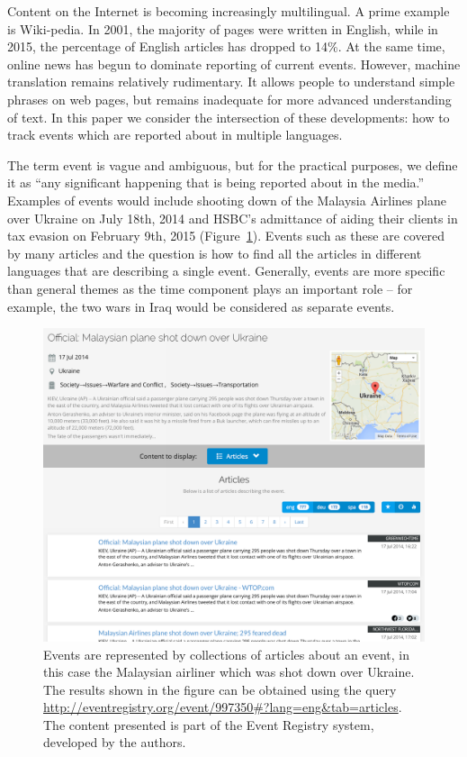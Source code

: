 \documentclass[twoside,11pt]{article}
\begin{document}
Content on the Internet is becoming increasingly multilingual. A prime example is Wiki-pedia. In 2001, the majority of pages were written in English, while in 2015, the percentage of English articles has dropped to 14\%. At the same time, online news has begun to dominate reporting of current events. However, machine translation remains relatively rudimentary. It allows people to understand simple phrases on web pages, but remains inadequate for more advanced understanding of text. In this paper we consider the intersection of these developments: how to track events which are reported about in multiple languages.

The term event is vague and ambiguous, but for the practical purposes, we define it as ``any significant happening that is being reported about in the media.'' Examples of events would include shooting down of the Malaysia Airlines plane over Ukraine on July 18th, 2014 and HSBC's admittance of aiding their clients in tax evasion on February 9th, 2015 (Figure~\ref{fig:event2}). Events such as these are covered by many articles and the question is how to find all the articles in different languages that are describing a single event. Generally, events are more specific than general themes as the time component plays an important role -- for example, the two wars in Iraq would be considered as separate events.


\begin{figure}
\centering
\includegraphics[width=1\textwidth]{events2.png}
\caption{\label{fig:event2} Events are represented by collections of articles about an event, in this case the Malaysian airliner which was shot down over Ukraine. The results shown in the figure can be obtained using the query \url{http://eventregistry.org/event/997350\#?lang=eng\&tab=articles}. The content presented is part of the Event Registry system, developed by the authors.}
\end{figure}
\end{document}
